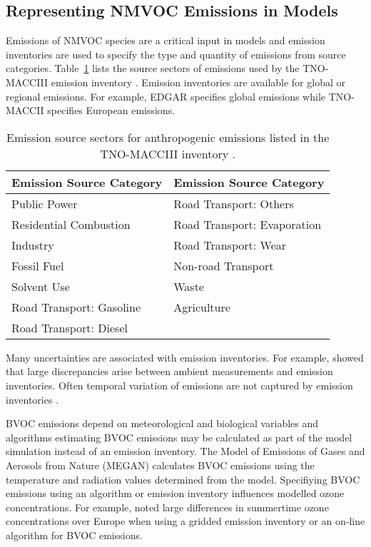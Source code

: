 \subsection{Representing NMVOC Emissions in Models}
Emissions of NMVOC species are a critical input in models and emission inventories are used to specify the type and quantity of emissions from source categories.
Table~\ref{t:SNAP} lists the source sectors of emissions used by the TNO-MACCIII emission inventory \citep{Kuenen:2014}.
Emission inventories are available for global or regional emissions.
For example, EDGAR \citep{Olivier:2001} specifies global emissions while TNO-MACCII \citep{Kuenen:2014} specifies European emissions.
\begin{table}[t]%
    \centering%
    \caption[Emission source sectors in the TNO\_MACCIII]{Emission source sectors for anthropogenic emissions listed in the TNO-MACCIII inventory \citep{Kuenen:2014}.}%
    \begin{tabular}{ll}%
        \hline \hline
        \textbf{Emission Source Category} & \textbf{Emission Source Category} \\
        \hline \hline
        Public Power & Road Transport: Others \\
        Residential Combustion & Road Transport: Evaporation \\
        Industry & Road Transport: Wear \\
        Fossil Fuel & Non-road Transport \\
        Solvent Use & Waste \\
        Road Transport: Gasoline & Agriculture \\
        Road Transport: Diesel & \\ 
        \hline \hline
    \end{tabular}%
    \label{t:SNAP}%
\end{table}%

Many uncertainties are associated with emission inventories.
For example, \citet{Coll:2010} showed that large discrepancies arise between ambient measurements and emission inventories.
Often temporal variation of emissions are not captured by emission inventories \citep{Boynard:2014}. 

BVOC emissions depend on meteorological and biological variables and algorithms estimating BVOC emissions may be calculated as part of the model simulation instead of an emission inventory.
The Model of Emissions of Gases and Aerosols from Nature (MEGAN) \citep{Guenther:2006, Guenther:2012} calculates BVOC emissions using the temperature and radiation values determined from the model.
Specifiying BVOC emissions using an algorithm or emission inventory influences modelled ozone concentrations. 
For example, \citet{Curci:2009} noted large differences in summertime ozone concentrations over Europe when using a gridded emission inventory or an on-line algorithm for BVOC emissions.

